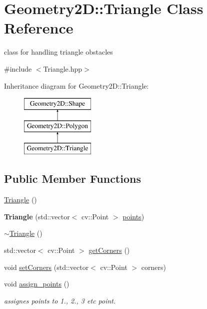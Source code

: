 \hypertarget{class_geometry2_d_1_1_triangle}{}\section{Geometry2D\+:\+:Triangle Class Reference}
\label{class_geometry2_d_1_1_triangle}


class for handling triangle obstacles  




{\ttfamily \#include $<$Triangle.\+hpp$>$}

Inheritance diagram for Geometry2D\+:\+:Triangle\+:\begin{figure}[H]
\begin{center}
\leavevmode
\includegraphics[height=3.000000cm]{class_geometry2_d_1_1_triangle}
\end{center}
\end{figure}
\subsection*{Public Member Functions}
\begin{DoxyCompactItemize}
\item 
\mbox{\hyperlink{class_geometry2_d_1_1_triangle_acd1c0636ad8f7f7659e75a4918770acf}{Triangle}} ()
\item 
\mbox{\label{class_geometry2_d_1_1_triangle_a021ed2abfba6fd0683c730c513d80646}} 
{\bfseries Triangle} (std\+::vector$<$ cv\+::\+Point $>$ \mbox{\hyperlink{class_geometry2_d_1_1_polygon_ab965e028324c2199022da00ff7eef14b}{points}})
\item 
\mbox{\hyperlink{class_geometry2_d_1_1_triangle_a0b731e9ceb72993005171096adba9096}{$\sim$\+Triangle}} ()
\item 
std\+::vector$<$ cv\+::\+Point $>$ \mbox{\hyperlink{class_geometry2_d_1_1_triangle_af7fa844cf4f260c2c41942e1bffd4c60}{get\+Corners}} ()
\item 
void \mbox{\hyperlink{class_geometry2_d_1_1_triangle_af689573b5d1a3b415ee2c236ed5e3abf}{set\+Corners}} (std\+::vector$<$ cv\+::\+Point $>$ corners)
\item 
\mbox{\label{class_geometry2_d_1_1_triangle_aae1d7c21bbade068d34e1dd799e9c742}} 
void \mbox{\hyperlink{class_geometry2_d_1_1_triangle_aae1d7c21bbade068d34e1dd799e9c742}{assign\+\_\+points}} ()
\begin{DoxyCompactList}\small\item\em assignes points to 1., 2., 3 etc point. \end{DoxyCompactList}\end{DoxyCompactItemize}
